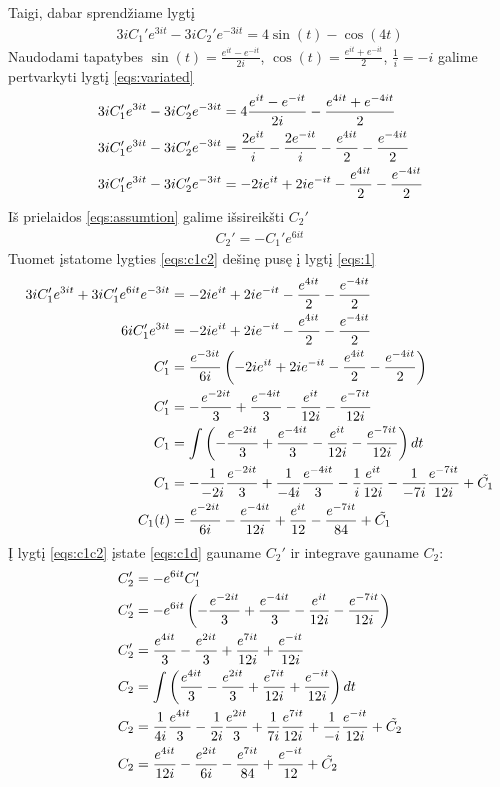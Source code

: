 \documentclass[11pt]{article}
\begin{document}
Taigi, dabar sprendžiame lygtį
\begin{align}
3iC_1'e^{3it}-3iC_2'e^{-3it}=4\sin(t)-\cos(4t)\label{eqs:variated}
\end{align}
Naudodami tapatybes $\sin(t)=\frac{e^{it}-e^{-it}}{2i}$, $\cos(t)=\frac{e^{it}+e^{-it}}{2}$, $\frac{1}{i}=-i$ galime pertvarkyti lygtį \eqref{eqs:variated}
\begin{align}
3iC_1'e^{3it}-3iC_2'e^{-3it}&=4\frac{e^{it}-e^{-it}}{2i}-\frac{e^{4it}+e^{-4it}}{2}\notag\\
3iC_1'e^{3it}-3iC_2'e^{-3it}&=\frac{2e^{it}}{i}-\frac{2e^{-it}}{i}-\frac{e^{4it}}{2}-\frac{e^{-4it}}{2}\notag\\
3iC_1'e^{3it}-3iC_2'e^{-3it}&=-2ie^{it}+2ie^{-it}-\frac{e^{4it}}{2}-\frac{e^{-4it}}{2}\label{eqs:1}
\end{align}
Iš prielaidos \eqref{eqs:assumtion} galime išsireikšti $C_2'$
\begin{align}
C_2'=-C_1'e^{6it} \label{eqs:c1c2}    
\end{align}
Tuomet įstatome lygties \eqref{eqs:c1c2} dešinę pusę į lygtį \eqref{eqs:1}
\begin{align}
3iC_1'e^{3it}+3iC_1'e^{6it}e^{-3it}&=-2ie^{it}+2ie^{-it}-\frac{e^{4it}}{2}-\frac{e^{-4it}}{2} \notag\\
6iC_1'e^{3it}&=-2ie^{it}+2ie^{-it}-\frac{e^{4it}}{2}-\frac{e^{-4it}}{2} \notag\\
C_1'&=\frac{e^{-3it}}{6i}\left(-2ie^{it}+2ie^{-it}-\frac{e^{4it}}{2}-\frac{e^{-4it}}{2}\right) \notag\\
C_1'&=-\frac{e^{-2it}}{3}+\frac{e^{-4it}}{3}-\frac{e^{it}}{12i}-\frac{e^{-7it}}{12i} \label{eqs:c1d}\\
C_1&=\int\left(-\frac{e^{-2it}}{3}+\frac{e^{-4it}}{3}-\frac{e^{it}}{12i}-\frac{e^{-7it}}{12i}\right)dt \notag\\
C_1&=-\frac{1}{-2i}\frac{e^{-2it}}{3}+\frac{1}{-4i}\frac{e^{-4it}}{3}-\frac{1}{i}\frac{e^{it}}{12i}-\frac{1}{-7i}\frac{e^{-7it}}{12i}+\tilde{C_1}\notag\\
C_1(t)&=\frac{e^{-2it}}{6i}-\frac{e^{-4it}}{12i}+\frac{e^{it}}{12}-\frac{e^{-7it}}{84}+\tilde{C_1} \label{eqs:c1}
\end{align}
Į lygtį \eqref{eqs:c1c2} įstate \eqref{eqs:c1d} gauname $C_2'$ ir integrave gauname $C_2$:
\begin{align}
C_2'&=-e^{6it}C_1'\notag\\
C_2'&=-e^{6it}\left(-\frac{e^{-2it}}{3}+\frac{e^{-4it}}{3}-\frac{e^{it}}{12i}-\frac{e^{-7it}}{12i}\right)\notag\\
C_2'&=\frac{e^{4it}}{3}-\frac{e^{2it}}{3}+\frac{e^{7it}}{12i}+\frac{e^{-it}}{12i}\notag\\
C_2&=\int\left(\frac{e^{4it}}{3}-\frac{e^{2it}}{3}+\frac{e^{7it}}{12i}+\frac{e^{-it}}{12i}\right)dt\notag\\
C_2&=\frac{1}{4i}\frac{e^{4it}}{3}-\frac{1}{2i}\frac{e^{2it}}{3}+\frac{1}{7i}\frac{e^{7it}}{12i}+\frac{1}{-i}\frac{e^{-it}}{12i}+\tilde{C_2}\notag\\
C_2&=\frac{e^{4it}}{12i}-\frac{e^{2it}}{6i}-\frac{e^{7it}}{84}+\frac{e^{-it}}{12}+\tilde{C_2}\label{eqs:c2}
\end{align}
\end{document}
